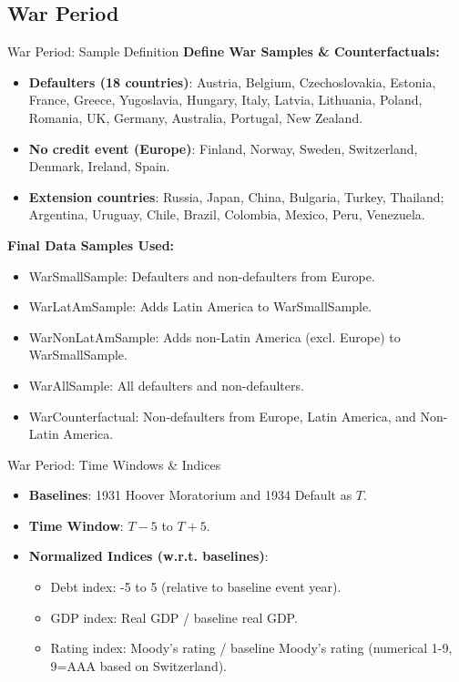 \documentclass{beamer}
\begin{document}
\subsection{War Period}
\begin{frame}{War Period: Sample Definition}
  \textbf{Define War Samples \& Counterfactuals:}
  \begin{itemize}
    \item \textbf{Defaulters (18 countries)}: Austria, Belgium, Czechoslovakia, Estonia, France, Greece, Yugoslavia, Hungary, Italy, Latvia, Lithuania, Poland, Romania, UK, Germany, Australia, Portugal, New Zealand.
    \item \textbf{No credit event (Europe)}: Finland, Norway, Sweden, Switzerland, Denmark, Ireland, Spain.
    \item \textbf{Extension countries}: Russia, Japan, China, Bulgaria, Turkey, Thailand; Argentina, Uruguay, Chile, Brazil, Colombia, Mexico, Peru, Venezuela.
  \end{itemize}
  \textbf{Final Data Samples Used:}
  \begin{itemize}
    \item WarSmallSample: Defaulters and non-defaulters from Europe.
    \item WarLatAmSample: Adds Latin America to WarSmallSample.
    \item WarNonLatAmSample: Adds non-Latin America (excl. Europe) to WarSmallSample.
    \item WarAllSample: All defaulters and non-defaulters.
    \item WarCounterfactual: Non-defaulters from Europe, Latin America, and Non-Latin America.
  \end{itemize}
\end{frame}

\begin{frame}{War Period: Time Windows \& Indices}
  \begin{itemize}
    \item \textbf{Baselines}: 1931 Hoover Moratorium and 1934 Default as $T$.
    \item \textbf{Time Window}: $T-5$ to $T+5$.
    \item \textbf{Normalized Indices (w.r.t. baselines)}:
    \begin{itemize}
        \item Debt index: -5 to 5 (relative to baseline event year).
        \item GDP index: Real GDP / baseline real GDP.
        \item Rating index: Moody's rating / baseline Moody's rating (numerical 1-9, 9=AAA based on Switzerland).
    \end{itemize}
  \end{itemize}
\end{frame}
\end{document}
